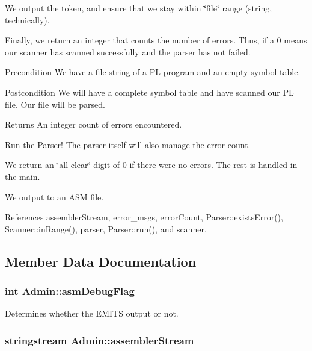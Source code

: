 We output the token, and ensure that we stay within \char`\"{}file\char`\"{} range (string, technically).

Finally, we return an integer that counts the number of errors. Thus, if a 0 means our scanner has scanned successfully and the parser has not failed.

\begin{DoxyPrecond}{Precondition}
We have a file string of a PL program and an empty symbol table. 
\end{DoxyPrecond}
\begin{DoxyPostcond}{Postcondition}
We will have a complete symbol table and have scanned our PL file. Our file will be parsed. 
\end{DoxyPostcond}
\begin{DoxyReturn}{Returns}
An integer count of errors encountered. 
\end{DoxyReturn}


Run the Parser! The parser itself will also manage the error count.

We return an \char`\"{}all clear\char`\"{} digit of 0 if there were no errors. The rest is handled in the main.

We output to an ASM file. 



References assemblerStream, error\_\-msgs, errorCount, Parser::existsError(), Scanner::inRange(), parser, Parser::run(), and scanner.



\subsection{Member Data Documentation}
\hypertarget{classAdmin_ac243ca073c9295f7a451089724093fae}{
\subsubsection[{asmDebugFlag}]{\setlength{\rightskip}{0pt plus 5cm}int {\bf Admin::asmDebugFlag}}}
\label{classAdmin_ac243ca073c9295f7a451089724093fae}


Determines whether the EMITS output or not. 

\hypertarget{classAdmin_a008c56533042666979d7c685dc5d01a8}{
\subsubsection[{assemblerStream}]{\setlength{\rightskip}{0pt plus 5cm}stringstream {\bf Admin::assemblerStream}}}
\label{classAdmin_a008c56533042666979d7c685dc5d01a8}



